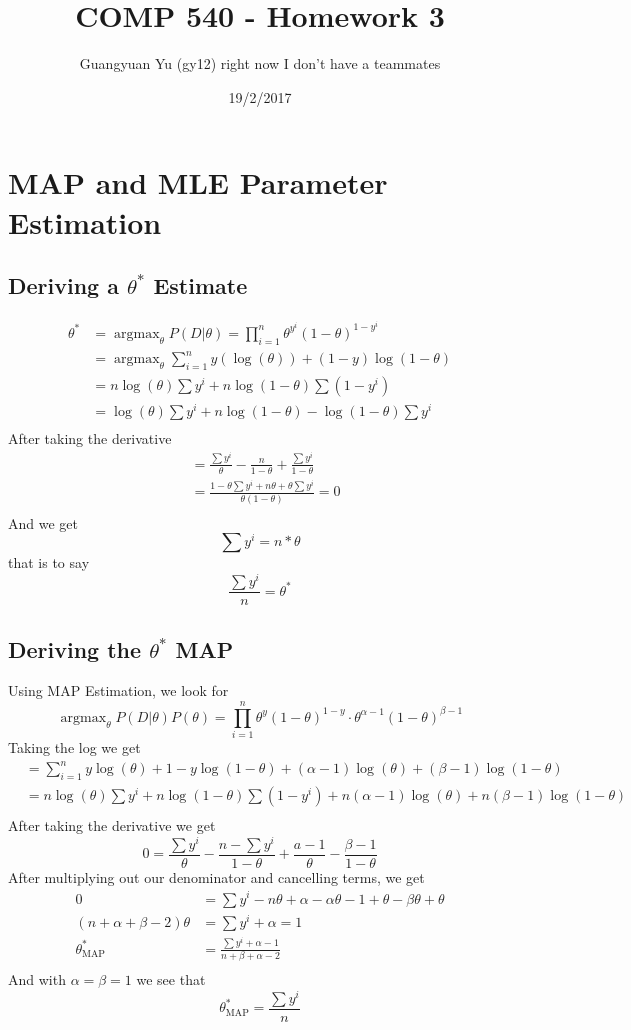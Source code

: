 \documentclass[pdftex,11pt]{article}
\title{COMP 540 - Homework 3}
\author{Guangyuan Yu (gy12) right now I don't have a teammates}
\date{19/2/2017}
\DeclareMathOperator*{\argmax}{argmax}
\DeclareMathOperator*{\MAP}{MAP}
\begin{document}
\maketitle

\section{MAP and MLE Parameter Estimation}
\subsection{Deriving a $\theta^{*}$ Estimate}

\begin{align*}
\theta^{*} &= \argmax_\theta P(D|\theta) = \prod_{i=1}^{n} \theta^{y^{i}}(1-\theta)^{1-y^{i}}\\
&=\argmax_\theta \sum_{i = 1}^{n}y(\log(\theta)) + (1-y)\log(1-\theta)\\
&=n\log(\theta)\sum y^i + n\log(1-\theta)\sum(1-y^i)\\
&=\log(\theta) \sum y^i + n\log(1-\theta) - \log(1-\theta) \sum y^i\\
\end{align*}
After taking the derivative
\begin{align*}
&=\frac{\sum y^i}{\theta} - \frac{n}{1-\theta} + \frac{\sum y^i}{1-\theta}\\
&=\frac{1-\theta \sum y^i + n\theta + \theta \sum y^i}{\theta(1-\theta)} = 0\\
\end{align*}
And we get $$\sum y^i=n*\theta$$
that is to say $$\frac{\sum y^i}{n}= \theta^*$$

\subsection{Deriving the $\theta^*$ MAP}
Using MAP Estimation, we look for
$$\argmax_\theta P(D|\theta)P(\theta) = \prod_{i=1}^{n}\theta^y(1-\theta)^{1-y}\cdot\theta^{\alpha-1}(1-\theta)^{\beta-1}$$
Taking the log we get
\begin{align*}
&=\sum_{i=1}^{n}y\log(\theta) + 1-y\log(1-\theta) + (\alpha-1)\log(\theta) + (\beta - 1)\log(1-\theta)\\
&=n\log(\theta)\sum y^i + n\log(1-\theta)\sum(1-y^i) + n(\alpha - 1)\log(\theta) + n(\beta-1)\log(1-\theta)\\
\end{align*}
After taking the derivative we get
$$0 = \frac{\sum y^i}{\theta} - \frac{n-\sum y^i}{1-\theta} + \frac{a-1}{\theta} - \frac{\beta - 1}{1-\theta}$$
After multiplying out our denominator and cancelling terms, we get
\begin{align*}
0 &= \sum y^i - n\theta + \alpha - \alpha \theta -1 + \theta - \beta \theta + \theta\\
(n +\alpha + \beta - 2)\theta &= \sum y^i + \alpha = 1\\
\theta^*_{\MAP} &= \frac{\sum y^i + \alpha - 1}{n + \beta + \alpha - 2}\\
\end{align*}
And with $\alpha = \beta = 1$ we see that
$$\theta^*_{\MAP} = \frac{\sum y^i}{n}$$
\end{document}
